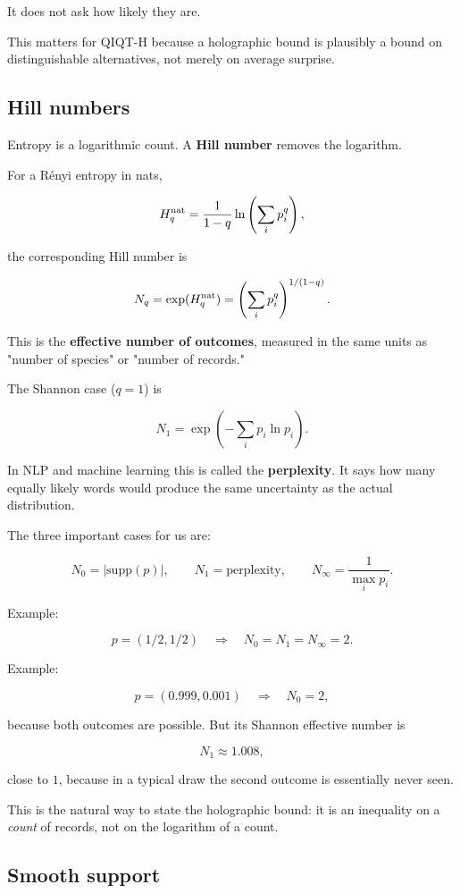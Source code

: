 \documentclass[11pt,a4paper]{article}
\begin{document}
It does not ask how likely they are.

This matters for QIQT-H because a holographic bound is plausibly a bound on distinguishable alternatives, not merely on average surprise.

\subsection{Hill numbers}

Entropy is a logarithmic count. A \textbf{Hill number} removes the logarithm.

For a Rényi entropy in nats,

\[
H_q^{\rm nat} = \frac{1}{1-q}\ln\left(\sum_i p_i^q\right),
\]

the corresponding Hill number is

\[
N_q = \exp(H_q^{\rm nat}) = \left(\sum_i p_i^q\right)^{1/(1-q)}.
\]

This is the \textbf{effective number of outcomes}, measured in the same units as "number of species" or "number of records."

The Shannon case ($q = 1$) is

\[
N_1 = \exp\left(-\sum_i p_i \ln p_i\right).
\]

In NLP and machine learning this is called the \textbf{perplexity}. It says how many equally likely words would produce the same uncertainty as the actual distribution.

The three important cases for us are:

\[
N_0 = |\mathrm{supp}(p)|, \qquad N_1 = \text{perplexity}, \qquad N_\infty = \frac{1}{\max_i p_i}.
\]

Example:

\[
p = (1/2, 1/2) \quad\Longrightarrow\quad N_0 = N_1 = N_\infty = 2.
\]

Example:

\[
p = (0.999, 0.001) \quad\Longrightarrow\quad N_0 = 2,
\]

because both outcomes are possible. But its Shannon effective number is

\[
N_1 \approx 1.008,
\]

close to $1$, because in a typical draw the second outcome is essentially never seen.

This is the natural way to state the holographic bound: it is an inequality on a \emph{count} of records, not on the logarithm of a count.

\subsection{Smooth support}
\end{document}
